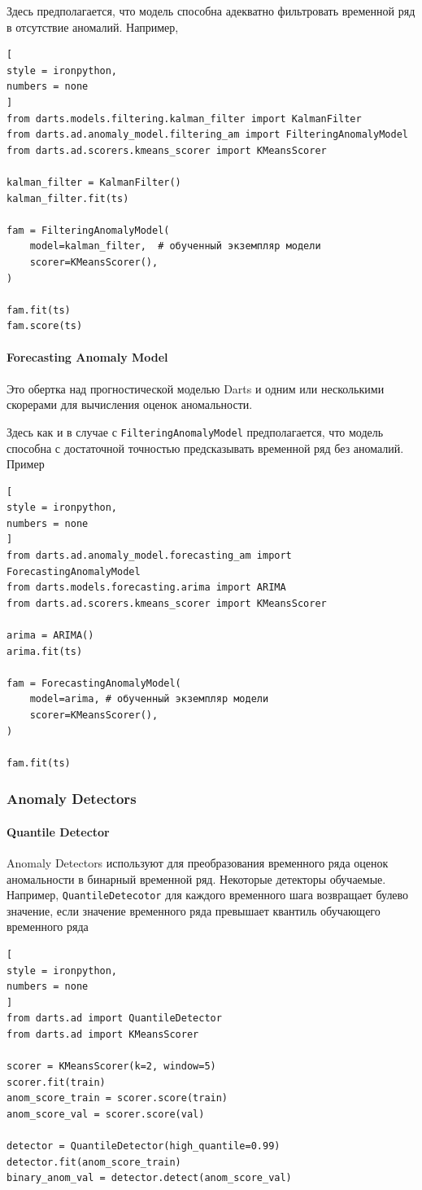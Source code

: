 \documentclass[%
	11pt,
	a4paper,
	utf8,
		]{article}
\begin{document}
Здесь предполагается, что модель способна адекватно фильтровать временной ряд в отсутствие аномалий. Например,
\begin{lstlisting}[
style = ironpython,
numbers = none
]
from darts.models.filtering.kalman_filter import KalmanFilter
from darts.ad.anomaly_model.filtering_am import FilteringAnomalyModel
from darts.ad.scorers.kmeans_scorer import KMeansScorer

kalman_filter = KalmanFilter()
kalman_filter.fit(ts)

fam = FilteringAnomalyModel(
    model=kalman_filter,  # обученный экземпляр модели
    scorer=KMeansScorer(),
)

fam.fit(ts)
fam.score(ts)
\end{lstlisting}

\paragraph{Forecasting Anomaly Model} Это обертка над прогностической моделью Darts и одним или несколькими скорерами для вычисления оценок аномальности.

Здесь как и в случае с \verb|FilteringAnomalyModel| предполагается, что модель способна с достаточной точностью предсказывать временной ряд без аномалий. Пример

\begin{lstlisting}[
style = ironpython,
numbers = none
]
from darts.ad.anomaly_model.forecasting_am import ForecastingAnomalyModel
from darts.models.forecasting.arima import ARIMA
from darts.ad.scorers.kmeans_scorer import KMeansScorer

arima = ARIMA()
arima.fit(ts)

fam = ForecastingAnomalyModel(
    model=arima, # обученный экземпляр модели
    scorer=KMeansScorer(),
)

fam.fit(ts)
\end{lstlisting}

\subsubsection{Anomaly Detectors}

\paragraph{Quantile Detector}

Anomaly Detectors используют для преобразования временного ряда оценок аномальности в бинарный временной ряд. Некоторые детекторы обучаемые. Например, \verb|QuantileDetecotor| для каждого временного шага возвращает булево значение, если значение временного ряда превышает квантиль обучающего временного ряда
\begin{lstlisting}[
style = ironpython,
numbers = none	
]
from darts.ad import QuantileDetector
from darts.ad import KMeansScorer

scorer = KMeansScorer(k=2, window=5)
scorer.fit(train)
anom_score_train = scorer.score(train)
anom_score_val = scorer.score(val)

detector = QuantileDetector(high_quantile=0.99)
detector.fit(anom_score_train)
binary_anom_val = detector.detect(anom_score_val)
\end{lstlisting}
\end{document}
